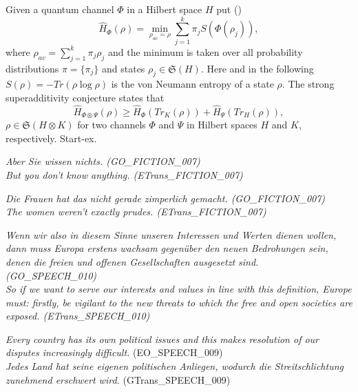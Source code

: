 \documentclass[twocolumn,showpacs,preprintnumbers,amsmath,amssymb]{revtex4}
\begin{document}
Given a quantum channel $\Phi $ in a Hilbert space $H$ put (\cite
{Sh})
\begin {equation}\label {quant}
\hat H_{\Phi}(\rho)=\min \limits _{\rho _{av}=\rho}\sum \limits
_{j=1}^{k}\pi _{j}S(\Phi (\rho _{j})),
\end {equation}
where $\rho _{av}=\sum \limits _{j=1}^{k}\pi _{j}\rho _{j}$ and
the minimum is taken over all probability distributions $\pi
=\{\pi _{j}\}$ and states $\rho _{j}\in \mathfrak{S}(H)$. Here
and in the following $S(\rho)=-Tr(\rho\log \rho)$ is the von
Neumann entropy of a state $\rho $. The strong superadditivity
conjecture states that
\begin {equation}\label {strong}
\hat H_{\Phi \otimes \Psi}(\rho)\ge \hat
H_{\Phi}(Tr_{K}(\rho))+\hat H_{\Psi}(Tr_{H}(\rho)),
\end {equation}
$\rho \in \mathfrak{S}(H\otimes K)$ for two channels $\Phi $ and
$\Psi $ in Hilbert spaces $H$ and $K$, respectively. Start-ex.



\ea\label{ex:culo:24}
  \ea 
\textit{Aber Sie wissen nichts. \textup{(GO\_FICTION\_007)}}\\
  \ex 
\textit{But you don't know anything. \textup{(ETrans\_FICTION\_007)}}
  \z
\z 


\ea \label{ex:culo:25}
  \ea 
\textit{Die Frauen hat das nicht gerade zimperlich gemacht. \textup{(GO\_FICTION\_007)}}\\
   \ex \textit{The women weren't exactly prudes. \textup{(ETrans\_FICTION\_007)}}
   \z
\z


\ea \label{ex:culo:26}
   \ea
\textit{Wenn wir also in diesem Sinne unseren Interessen und Werten dienen wollen, dann   muss Europa erstens wachsam gegenüber den neuen Bedrohungen sein, denen die   freien und offenen Gesellschaften ausgesetzt sind. \textup{(GO\_SPEECH\_010)}}\\
   \ex 
   \textit{So if we want to serve our interests and values in line with this definition, Europe must:   firstly, be vigilant to the new threats to which the free and open societies are exposed.   \textup{(ETrans\_SPEECH\_010)}}
   \z
\z




\ea \label{ex:culo:27}
     \ea \textit{Every country has its own political issues and this makes resolution of our disputes increasingly difficult.} (EO\_SPEECH\_009)\\
      \ex \textit{Jedes Land hat seine eigenen politischen Anliegen, wodurch die Streitschlichtung zunehmend erschwert wird.} (GTrans\_SPEECH\_009) 
      \z
\z
\end{document}
